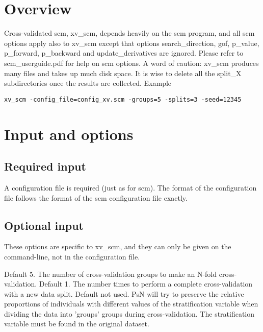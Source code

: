 



\maketitle


\section{Overview}
Cross-validated scm, xv\_scm, depends heavily on the scm program, and all scm options apply also to xv\_scm except that options search\_direction, gof, p\_value, p\_forward, p\_backward and update\_derivatives are ignored. Please refer to scm\_userguide.pdf for help on scm options.
A word of caution: xv\_scm produces many files and takes up much disk space. It is wise to delete all the split\_X subdirectories once the results are collected.
Example
\begin{verbatim}
xv_scm -config_file=config_xv.scm -groups=5 -splits=3 -seed=12345
\end{verbatim}

\section{Input and options}

\subsection{Required input}
A configuration file is required (just as for scm).  The format of the configuration file follows the format of the scm configuration file exactly.

\subsection{Optional input}

These options are specific to xv\_scm, and they can only be given on the command-line, not in the configuration file.

\begin{optionlist}
Default 5. The number of cross-validation groups to make an N-fold cross-validation. 
\nextopt
{}
Default 1. The number times to perform a complete cross-validation with a new data split. 
\nextopt
{}
Default not used. PsN will try to preserve the relative proportions of individuals with different values of the stratification variable when dividing the data into 'groups' groups during cross-validation. The stratification variable must be found in the original dataset. 
\nextopt
\end{optionlist}

